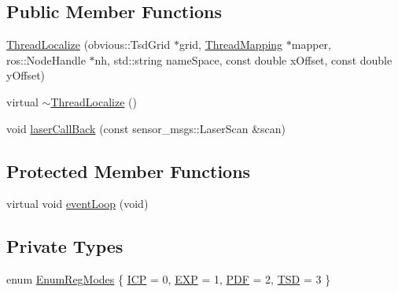 \subsection*{Public Member Functions}
\begin{DoxyCompactItemize}
\item 
\hyperlink{classohm__tsd__slam__ref_1_1ThreadLocalize_a6664fba91fb551b13cf721638b55f36e}{Thread\-Localize} (obvious\-::\-Tsd\-Grid $\ast$grid, \hyperlink{classohm__tsd__slam__ref_1_1ThreadMapping}{Thread\-Mapping} $\ast$mapper, ros\-::\-Node\-Handle $\ast$nh, std\-::string name\-Space, const double x\-Offset, const double y\-Offset)
\item 
virtual \hyperlink{classohm__tsd__slam__ref_1_1ThreadLocalize_a4cb409859b390b9b1082b8a56d760f5f}{$\sim$\-Thread\-Localize} ()
\item 
void \hyperlink{classohm__tsd__slam__ref_1_1ThreadLocalize_ab93dfc8a688c178b641ef5deec94bf91}{laser\-Call\-Back} (const sensor\-\_\-msgs\-::\-Laser\-Scan \&scan)
\end{DoxyCompactItemize}
\subsection*{Protected Member Functions}
\begin{DoxyCompactItemize}
\item 
virtual void \hyperlink{classohm__tsd__slam__ref_1_1ThreadLocalize_a93b32600effe05fe0db9fdf74cd40aa7}{event\-Loop} (void)
\end{DoxyCompactItemize}
\subsection*{Private Types}
\begin{DoxyCompactItemize}
\item 
enum \hyperlink{classohm__tsd__slam__ref_1_1ThreadLocalize_ac5ed59506607265dc4c38a64cf36156f}{Enum\-Reg\-Modes} \{ \hyperlink{classohm__tsd__slam__ref_1_1ThreadLocalize_ac5ed59506607265dc4c38a64cf36156fa4c2ccd40e418593ae90c9844a7e8b27b}{I\-C\-P} = 0, 
\hyperlink{classohm__tsd__slam__ref_1_1ThreadLocalize_ac5ed59506607265dc4c38a64cf36156faa5d6bcb6b063925c8ceee9660ba6fe82}{E\-X\-P} = 1, 
\hyperlink{classohm__tsd__slam__ref_1_1ThreadLocalize_ac5ed59506607265dc4c38a64cf36156fa5fca603cf985a7804238323fc6261c45}{P\-D\-F} = 2, 
\hyperlink{classohm__tsd__slam__ref_1_1ThreadLocalize_ac5ed59506607265dc4c38a64cf36156fae6fb70bc18328170438ececea919a178}{T\-S\-D} = 3
 \}
\end{DoxyCompactItemize}
